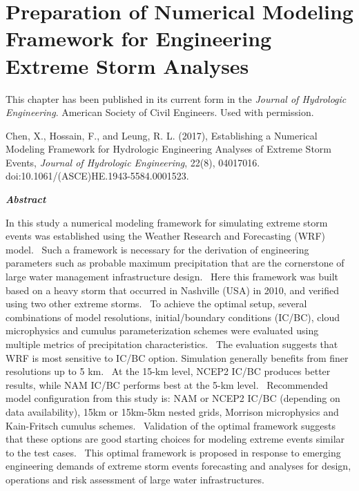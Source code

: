 \chapter {Preparation of Numerical Modeling Framework for Engineering Extreme Storm Analyses}
\label{ch:JHE}
 
This chapter has been published in its current form in the \textit{Journal of Hydrologic Engineering}. \textcopyright American Society of Civil Engineers. Used with permission.\\

\bigbreak

\noindent
{}
\setlength{\hangindent}{2em}
Chen, X., Hossain, F., and Leung, R. L. (2017), Establishing a Numerical Modeling Framework for Hydrologic Engineering Analyses of Extreme Storm Events, \textit{Journal of Hydrologic Engineering}, 22(8), 04017016. doi:10.1061/(ASCE)HE.1943-5584.0001523.

\vspace{10mm}

\noindent
\textit{\textbf{Abstract}}
 
In this study a numerical modeling framework for simulating extreme storm events was established using the Weather Research and Forecasting (WRF) model. \
Such a framework is necessary for the derivation of engineering parameters such as probable maximum precipitation that are the cornerstone of large water management infrastructure design. \
Here this framework was built based on a heavy storm that occurred in Nashville (USA) in 2010, and verified using two other extreme storms. \
To achieve the optimal setup, several combinations of model resolutions, initial/boundary conditions (IC/BC), cloud microphysics and cumulus parameterization schemes were evaluated using multiple metrics of precipitation characteristics. \
The evaluation suggests that WRF is most sensitive to IC/BC option. Simulation generally benefits from finer resolutions up to 5 km. \
At the 15-km level, NCEP2 IC/BC produces better results, while NAM IC/BC performs best at the 5-km level. \
Recommended model configuration from this study is: NAM or NCEP2 IC/BC (depending on data availability), 15km or 15km-5km nested grids, Morrison microphysics and Kain-Fritsch cumulus schemes. \
Validation of the optimal framework suggests that these options are good starting choices for modeling extreme events similar to the test cases. \
This optimal framework is proposed in response to emerging engineering demands of extreme storm events forecasting and analyses for design, operations and risk assessment of large water infrastructures.

